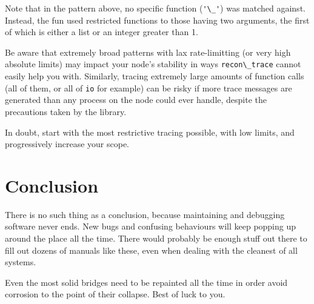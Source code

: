 \documentclass[11pt, oneside]{book}   	%
\newcommand{\module}[1]{\Verb`#1`}
\newcommand{\expression}[1]{\Verb`#1`}
\begin{document}
Note that in the pattern above, no specific function (\expression{'\_'}) was matched against. Instead, the fun used restricted functions to those having two arguments, the first of which is either a list or an integer greater than 1.

Be aware that extremely broad patterns with lax rate-limitting (or very high absolute limits) may impact your node's stability in ways \module{recon\_trace} cannot easily help you with. Similarly, tracing extremely large amounts of function calls (all of them, or all of \module{io} for example) can be risky if more trace messages are generated than any process on the node could ever handle, despite the precautions taken by the library.

In doubt, start with the most restrictive tracing possible, with low limits, and progressively increase your scope.










\chapter{Conclusion}

There is no such thing as a conclusion, because maintaining and debugging software never ends. New bugs and confusing behaviours will keep popping up around the place all the time. There would probably be enough stuff out there to fill out dozens of  manuals like these, even when dealing with the cleanest of all systems.

Even the most solid bridges need to be repainted all the time in order avoid corrosion to the point of their collapse. Best of luck to you.
\end{document}

